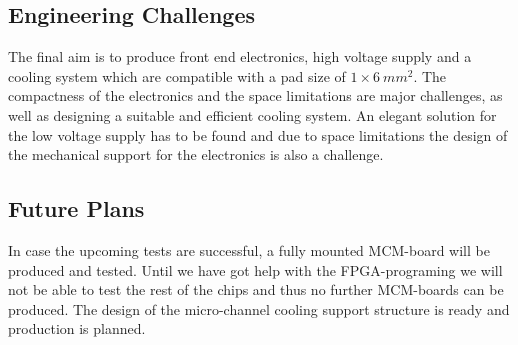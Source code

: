 \subsection{Engineering Challenges}
The final aim is to produce front end electronics, high voltage supply and a cooling system which are compatible with a pad size of $1 \times \SI{6}{mm^2}$. The compactness of the electronics and the space limitations are major challenges, as well as designing a suitable and efficient cooling system. An elegant solution for the low voltage supply has to be found and due to space limitations the design of the mechanical support for the electronics is also a challenge.

\subsection{Future Plans}
In case the upcoming tests are successful, a fully mounted MCM-board will be produced and tested.
Until we have got help with the FPGA-programing we will not be able to test the rest of the chips and
thus no further MCM-boards can be produced.
The design of the micro-channel cooling support structure is ready and production is planned.

